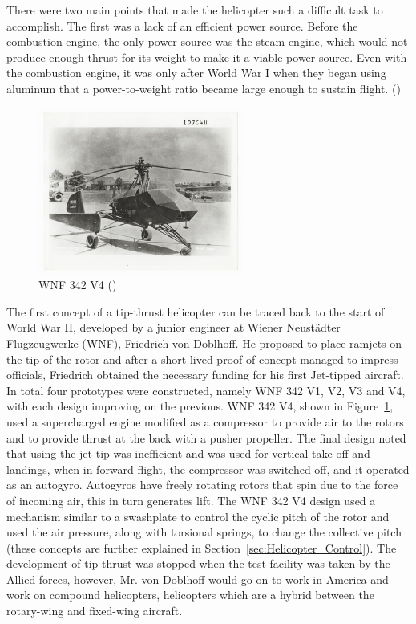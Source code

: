     There were two main points that made the helicopter such a difficult task to accomplish. The first was a lack of an efficient power source. Before the combustion engine, the only power source was the steam engine, which would not produce enough thrust for its weight to make it a viable power source. Even with the combustion engine, it was only after World War I when they began using aluminum that a power-to-weight ratio became large enough to sustain flight. (\cite{stepniewski1984rotary})\\
    
    \begin{figure}[H]
        \centering
        \includegraphics[width = 0.6\textwidth]{figs/WNF V4.jpg}
        \caption{WNF 342 V4 (\cite{Linenbaum_2020})}
        \label{fig:WNF_432_V4}
    \end{figure}

    The first concept of a tip-thrust helicopter can be traced back to the start of World War II, developed by a junior engineer at Wiener Neustädter Flugzeugwerke (WNF), Friedrich von Doblhoff. He proposed to place ramjets on the tip of the rotor and after a short-lived proof of concept managed to impress officials, Friedrich obtained the necessary funding for his first Jet-tipped aircraft. In total four prototypes were constructed, namely WNF 342 V1, V2, V3 and V4, with each design improving on the previous. WNF 342 V4, shown in  Figure~\ref{fig:WNF_432_V4}, used a supercharged engine modified as a compressor to provide air to the rotors and to provide thrust at the back with a pusher propeller. The final design noted that using the jet-tip was inefficient and was used for vertical take-off and landings, when in forward flight, the compressor was switched off, and it operated as an autogyro. Autogyros have freely rotating rotors that spin due to the force of incoming air, this in turn generates lift. The WNF 342 V4 
    design used a mechanism similar to a swashplate to control the cyclic pitch of the rotor and used the air pressure, along with torsional springs, to change the collective pitch (these concepts are further explained in Section~\ref{sec:Helicopter_Control}). The development of tip-thrust was stopped when the test facility was taken by the Allied forces, however, Mr. von Doblhoff would go on to work in America and work on compound helicopters, helicopters which are a hybrid between the rotary-wing and fixed-wing aircraft.  

